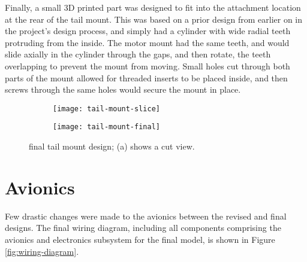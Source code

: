 \documentclass[../../main.tex]{subfiles}
\begin{document}
Finally, a small 3D printed part was designed to fit into the attachment location at the rear of the tail mount.
This was based on a prior design from earlier on in the project's design process, and simply had a cylinder with wide radial teeth protruding from the inside.
The motor mount had the same teeth, and would slide axially in the cylinder through the gaps, and then rotate, the teeth overlapping to prevent the mount from moving.
Small holes cut through both parts of the mount allowed for threaded inserts to be placed inside, and then screws through the same holes would secure the mount in place. 


\begin{figure}[H]
    \centering
    \begin{subfigure}[b]{0.49\columnwidth}
        \centering
        \texttt{[image: tail-mount-slice]}
        \caption{}
        \label{fig:tail-mount-design:slice}
    \end{subfigure}
    \hfill
    \begin{subfigure}[b]{0.49\columnwidth}
        \centering
        \texttt{[image: tail-mount-final]}
        \caption{}
        \label{fig:tail-mount-design:whole}
    \end{subfigure}
    
    \caption{final tail mount design; (a) shows a cut view.}
    \label{fig:tail-mount-design}
\end{figure} 



\section{Avionics} \label{sec:final-design-proposal:avionics}

Few drastic changes were made to the avionics between the revised and final designs.
The final wiring diagram, including all components comprising the avionics and electronics subsystem for the final model, is shown in Figure \ref{fig:wiring-diagram}.

\end{document}
